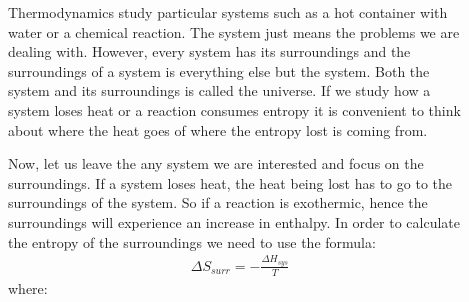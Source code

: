 \documentclass[main.tex]{subfiles}
\newcommand\chapterlabel{entropy}
\begin{document}
\begin{description}
\item[] Thermodynamics study particular systems such as a hot container with water or a chemical reaction. The system just means the problems we are dealing with. However, every system has its surroundings and the surroundings of a system is everything else but the system. Both the system and its surroundings is called the universe. If we study how a system loses heat or a reaction consumes entropy it is convenient to think about where the heat goes of where the entropy lost is coming from.
\item[] 
Now, let us leave the any system we are interested and focus on the surroundings. If a system loses heat, the heat being lost has to go to the surroundings of the system. So if a reaction is exothermic, hence the surroundings will experience an increase in enthalpy. In order to calculate the entropy of the surroundings we need to use the formula:
\begin{equation}\begin{split}
\boxed{  \Delta S_{surr}=-\frac{\Delta H_{sys}}{T}   }
\label{\chapterlabel:equation4}
\end{split}\end{equation}
where:


\end{description}
\end{document}
